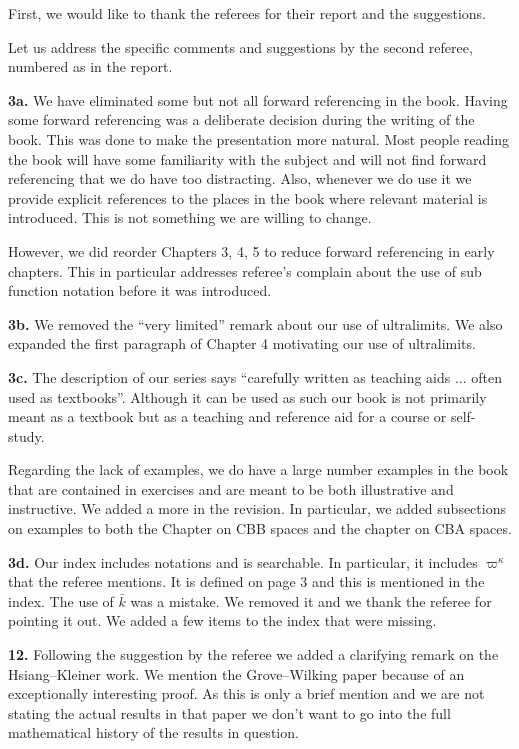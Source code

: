 \documentclass[11pt]{amsart}
\begin{document}
First, we would like to thank the referees for their report and the suggestions.

Let us address the specific comments and suggestions by the second referee, numbered as in the report.

\medskip

{\bf 3a.} 
We have eliminated some but not all forward referencing in the book.
Having some forward referencing was a deliberate decision during the writing of the book. This was done to make the presentation more natural. Most people reading the book will have some familiarity with the subject and will not find forward referencing that we do have
too distracting.
Also, whenever we do use it we provide explicit references to the places in the book where relevant material is introduced.
This is not something we are willing to change.

However, we did reorder Chapters 3, 4, 5 to reduce forward referencing in early chapters.
This in particular addresses referee's complain about the use of sub function notation before it was introduced.

\medskip

{\bf 3b.} 
We removed the ``very limited'' remark about our use of ultralimits. We also expanded the first paragraph of Chapter 4 motivating our use of ultralimits. 

\medskip

{\bf 3c.}
The description of our series says ``carefully written as teaching aids ... often used as textbooks''.  Although it can be used as such our book is not primarily meant as a textbook but as a teaching and reference aid for a course or self-study.

Regarding the lack of examples, we do have a large number examples in the book that are contained in exercises and are meant to be both illustrative and instructive.
We added a more in the revision.
In particular, we added subsections on examples to both the Chapter on CBB spaces and the chapter on CBA spaces.

\medskip

{\bf 3d. }
Our index includes notations and is searchable.
In particular, it includes $\varpi^\kappa$ that the referee mentions. It is defined on page 3 and this is mentioned in the index.
The use of $\bar k$ was a mistake.
We removed it and we thank the referee for pointing it out.
We added a few  items to the index that were missing. 

\medskip

{\bf 12.}
Following the suggestion by the referee we added a clarifying remark on the Hsiang--Kleiner work.
We mention the Grove--Wilking paper because of an exceptionally interesting proof. As this is only a brief mention and we are not stating the actual results in that paper we don't want to go into the full mathematical history of the results in question.
\end{document}

